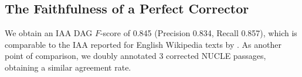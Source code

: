 \documentclass[letter,11pt]{article}
\begin{document}




\subsection{The Faithfulness of a Perfect Corrector}

We obtain an IAA DAG $F$-score of 0.845
(Precision 0.834, Recall 0.857), which
is comparable to the IAA reported for English Wikipedia texts by \cite{abend2013universal}.
As another point of comparison, we doubly annotated 3 corrected NUCLE passages, obtaining a similar agreement rate.
\end{document}
